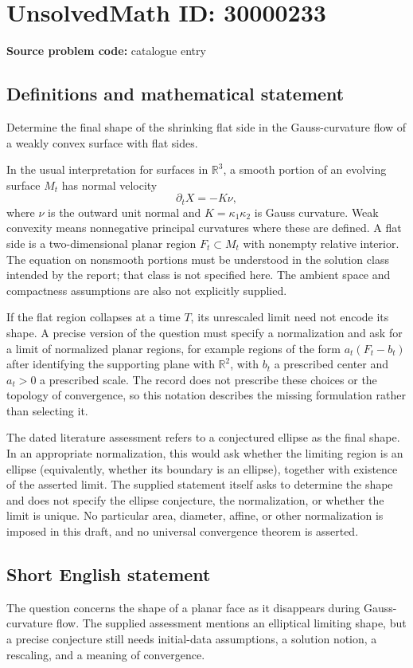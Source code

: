 \documentclass[11pt]{article}
\newcommand{\R}{\mathbb{R}}
\begin{document}
\section*{UnsolvedMath ID: 30000233}
\textbf{Source problem code:} catalogue entry
\subsection{Definitions and mathematical statement}
Determine the final shape of the shrinking flat side in the Gauss-curvature flow of a weakly convex surface with flat sides.

In the usual interpretation for surfaces in $\R^3$, a smooth portion of an evolving surface $M_t$ has normal velocity
\[
 \partial_t X=-K\nu,
\]
where $\nu$ is the outward unit normal and $K=\kappa_1\kappa_2$ is Gauss curvature. Weak convexity means nonnegative principal curvatures where these are defined. A flat side is a two-dimensional planar region $F_t\subset M_t$ with nonempty relative interior. The equation on nonsmooth portions must be understood in the solution class intended by the report; that class is not specified here. The ambient space and compactness assumptions are also not explicitly supplied.

If the flat region collapses at a time $T$, its unrescaled limit need not encode its shape. A precise version of the question must specify a normalization and ask for a limit of normalized planar regions, for example regions of the form $a_t(F_t-b_t)$ after identifying the supporting plane with $\R^2$, with $b_t$ a prescribed center and $a_t>0$ a prescribed scale. The record does not prescribe these choices or the topology of convergence, so this notation describes the missing formulation rather than selecting it.

The dated literature assessment refers to a conjectured ellipse as the final shape. In an appropriate normalization, this would ask whether the limiting region is an ellipse (equivalently, whether its boundary is an ellipse), together with existence of the asserted limit. The supplied statement itself asks to determine the shape and does not specify the ellipse conjecture, the normalization, or whether the limit is unique. No particular area, diameter, affine, or other normalization is imposed in this draft, and no universal convergence theorem is asserted.
\subsection{Short English statement}
The question concerns the shape of a planar face as it disappears during Gauss-curvature flow. The supplied assessment mentions an elliptical limiting shape, but a precise conjecture still needs initial-data assumptions, a solution notion, a rescaling, and a meaning of convergence.
\end{document}
